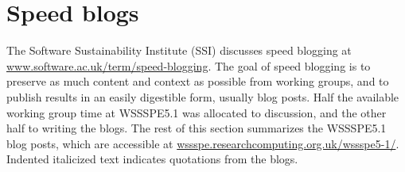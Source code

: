 \documentclass[11pt,letterpaper]{article}
\newcommand{\note}[1]{ {\textcolor{blueish}        { ***Note: #1 }}}
\begin{document}
\section{Speed blogs} \label{sec:speed_blogs}



The Software Sustainability Institute (SSI) discusses speed blogging at \href{https://www.software.ac.uk/term/speed-blogging}{www.software.ac.uk/term/speed-blogging}.
%
The goal of speed blogging is to preserve as much content and context as possible from working groups, and to publish results in an easily digestible form, usually blog posts. 
Half the available working group time at WSSSPE5.1 was allocated to discussion, and the other half to writing the blogs. 
%
%
The rest of this section summarizes the WSSSPE5.1 blog posts, which are accessible at \href{http://wssspe.researchcomputing.org.uk/wssspe5-1/}{wssspe.researchcomputing.org.uk/wssspe5-1/}. Indented italicized text indicates quotations from the blogs.
\end{document}
